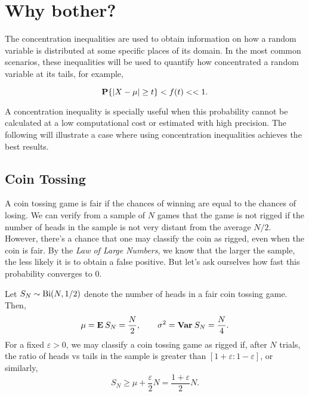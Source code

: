   


\vspace*{2em}

\section{Why bother?}

The concentration inequalities are used to obtain information on how a random variable is distributed at some specific places of its domain. In the most common scenarios, these inequalities will be used to quantify how concentrated a random variable at its tails, for example,

\[ \P\{|X-\mu| \geq t\} < f(t) << 1. \]

A concentration inequality is specially useful when this probability cannot be calculated at a low computational cost or estimated with high precision. The following  will illustrate a case where using concentration inequalities achieves the best results.

\subsection{Coin Tossing}

A coin tossing game is fair if the chances of winning are equal to the chances of losing. We can verify from a sample of $N$ games that the game is not rigged if the number of heads in the sample is not very distant from the average $N/2$. However, there's a chance that one may classify the coin as rigged, even when the coin is fair. By the \textit{Law of Large Numbers}, we know that the larger the sample, the less likely it is to obtain a false positive. But let's ask ourselves how fast this probability converges to 0.

\vspace*{1em}

Let $S_N \sim \Bi(N,1/2)$ denote the number of heads in a fair coin tossing game. Then,
\[ \mu = \E S_N = \frac{N}{2}, \hspace*{2em} \sigma^2 = \Var S_N = \frac{N}{4}. \] 
For a fixed $\varepsilon > 0$, we may classify a coin tossing game as rigged if, after $N$ trials, the ratio of heads vs tails in the sample is greater than $[1+\varepsilon:1-\varepsilon]$, or similarly,
\[ S_N \geq \mu +  \frac{\varepsilon}{2} N = \frac{1+\varepsilon}{2} N. \]


